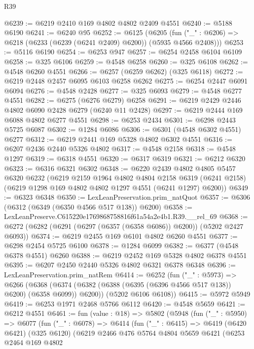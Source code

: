 \begin{lexlean}{R39}
\begin{coremodule}
@6239 := @6219 @2410 @169 @4802 @4802 @2409 @4551
@6240 := @5188 @6190
@6241 := @6240 @95
@6252 := @6125
    (@6205 (fun ("_" : @6206) => @6218 (@6233 (@6239 (@6241 @2409) @6200)) (@5935 @4566 @2408)))
@6253 := @5116 @6190
@6254 := @6253 @947
@6257 := @6254 @2458 @6104 @6109
@6258 := @325 @6106
@6259 := @4548 @6258
@6260 := @325 @6108
@6262 := @4548 @6260 @4551
@6266 := @6257 (@6259 @6262) (@325 @6118)
@6272 := @6219 @2448 @2457 @6095 @6103 @6258 @6262
@6275 := @6254 @2447 @6091 @6094
@6276 := @4548 @2428
@6277 := @325 @6093
@6279 := @4548 @6277 @4551
@6282 := @6275 (@6276 @6279) @6258
@6291 := @6219 @2429 @2446 @4802 @6090 @2428 @6279 (@6240 @11 @2428)
@6297 := @6219 @2444 @169 @6088 @4802 @6277 @4551
@6298 := @6253 @2434
@6301 := @6298 @2443 @5725 @6087
@6302 := @1284 @6086
@6306 := @6301 (@4548 @6302 @4551) @6277
@6312 := @6219 @2441 @169 @5328 @4802 @6302 @4551
@6316 := @6207 @2436 @2440 @5326 @4802
@6317 := @4548 @2158
@6318 := @4548 @1297
@6319 := @6318 @4551
@6320 := @6317 @6319
@6321 := @6212 @6320
@6323 := @6316 @6321 @6302
@6348 := @6220
    @2439
    @4802
    @4805
    @5457
    @6320
    @6232
    (@6219
      @2159
      @1964
      @4802
      @4804
      @2158
      @6319
      (@6241 @2158)
      (@6219 @1298 @169 @4802 @4802 @1297 @4551 (@6241 @1297) @6200))
@6349 := @6323 @6348
@6350 := LexLeanPreservation.prim_natQuot
@6357 := @6306 (@6312 (@6349 (@6350 @4566 @517 @138)) @6200)
@6358 := LexLeanPreserve.C615220e1769868758816f61a54a2e4b1.R39.__rel_69
@6368 := @6272 (@6282 (@6291 (@6297 (@6357 (@6358 @6086)) @6200)) (@5202 @2427 @6093))
@6374 := @6219 @2455 @169 @6101 @4802 @6260 @4551
@6377 := @6298 @2454 @5725 @6100
@6378 := @1284 @6099
@6382 := @6377 (@4548 @6378 @4551) @6260
@6388 := @6219 @2452 @169 @5328 @4802 @6378 @4551
@6395 := @6207 @2450 @2440 @5326 @4802 @6321 @6378 @6348
@6396 := LexLeanPreservation.prim_natRem
@6414 := @6252
    (fun ("_" : @5973) =>
    @6266
      (@6368 (@6374 (@6382 (@6388 (@6395 (@6396 @4566 @517 @138)) @6200) (@6358 @6099)) @6200))
      (@5202 @6106 @6108))
@6415 := @5972 @5949
@6419 := @6253 @1971 @2468 @5766 @6112
@6420 := @4548 @5659
@6421 := @6212 @4551
@6461 := fun (value : @18) =>
  @5802
    (@5948
      (fun ("_" : @5950) =>
      @6077
        (fun ("_" : @6078) =>
        @6414
          (fun ("_" : @6415) =>
          @6419
            (@6420 @6421)
            (@325 @6120)
            (@6219
              @2466
              @476
              @5764
              @4804
              @5659
              @6421
              (@6253
                @2464
                @169
                @4802

\end{coremodule}
\end{lexlean}
